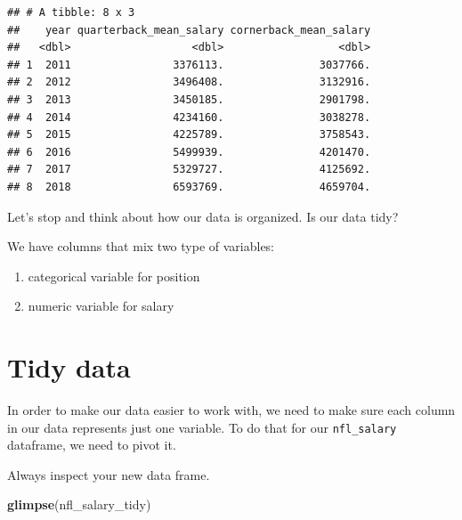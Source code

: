 \documentclass[
]{book}
\newenvironment{Shaded}{\begin{snugshade}}{\end{snugshade}}
\newcommand{\DataTypeTok}[1]{\textcolor[rgb]{0.13,0.29,0.53}{#1}}
\newcommand{\KeywordTok}[1]{\textcolor[rgb]{0.13,0.29,0.53}{\textbf{#1}}}
\newcommand{\NormalTok}[1]{#1}
\newcommand{\OperatorTok}[1]{\textcolor[rgb]{0.81,0.36,0.00}{\textbf{#1}}}
\newcommand{\StringTok}[1]{\textcolor[rgb]{0.31,0.60,0.02}{#1}}
\begin{document}
\begin{verbatim}
## # A tibble: 8 x 3
##    year quarterback_mean_salary cornerback_mean_salary
##   <dbl>                   <dbl>                  <dbl>
## 1  2011                3376113.               3037766.
## 2  2012                3496408.               3132916.
## 3  2013                3450185.               2901798.
## 4  2014                4234160.               3038278.
## 5  2015                4225789.               3758543.
## 6  2016                5499939.               4201470.
## 7  2017                5329727.               4125692.
## 8  2018                6593769.               4659704.
\end{verbatim}

Let's stop and think about how our data is organized. Is our data tidy?

We have columns that mix two type of variables:

\begin{enumerate}
\def\labelenumi{\alph{enumi})}
\item
  categorical variable for position
\item
  numeric variable for salary
\end{enumerate}

\hypertarget{tidy-data}{%
\section{Tidy data}\label{tidy-data}}

In order to make our data easier to work with, we need to make sure each column in our data represents just one variable. To do that for our \texttt{nfl\_salary} dataframe, we need to pivot it.

\begin{Shaded}
\end{Shaded}

Always inspect your new data frame.

\begin{Shaded}
\begin{Highlighting}[]
\KeywordTok{glimpse}\NormalTok{(nfl_salary_tidy)}
\end{Highlighting}
\end{Shaded}
\end{document}
